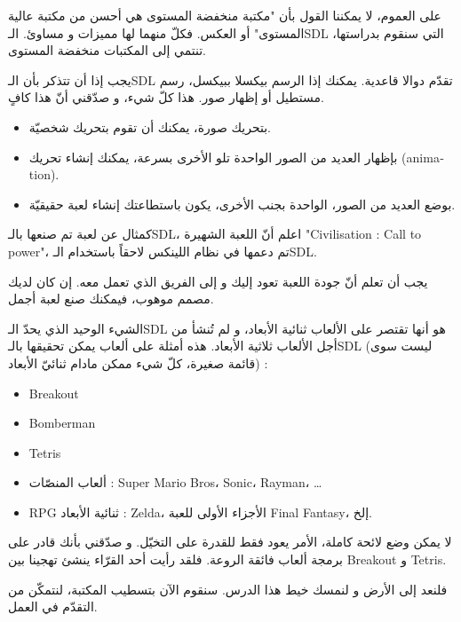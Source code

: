 على العموم، لا يمكننا القول بأن "مكتبة منخفضة المستوى هي أحسن من مكتبة عالية المستوى" أو العكس. فكلّ منهما لها مميزات و مساوئ. الـ\textenglish{SDL}
التي سنقوم بدراستها، تنتمي إلى المكتبات منخفضة المستوى.

يجب إذا أن تتذكر بأن الـ\textenglish{SDL}
تقدّم دوالا قاعدية. يمكنك إذا الرسم بيكسلا ببيكسل، رسم مستطيل أو إظهار صور. هذا كلّ شيء، و صدّقني أنّ هذا كافٍ.

\begin{itemize}
	\item بتحريك صورة، يمكنك أن تقوم بتحريك شخصيّة.
	\item بإظهار العديد من الصور الواحدة تلو الأخرى بسرعة، يمكنك إنشاء تحريك
	(\textenglish{animation}).
	\item بوضع العديد من الصور، الواحدة بجنب الأخرى، يكون باستطاعتك إنشاء لعبة حقيقيّة.
\end{itemize}

كمثال عن لعبة تم صنعها بالـ\textenglish{SDL}،
اعلم أنّ اللعبة الشهيرة
"\textenglish{Civilisation : Call to power}"،
تم دعمها في نظام اللينكس لاحقاً باستخدام الـ\textenglish{SDL}.


يجب أن تعلم أنّ جودة اللعبة تعود إليك و إلى الفريق الذي تعمل معه. إن كان لديك مصمم موهوب، فيمكنك صنع لعبة أجمل.

الشيء الوحيد الذي يحدّ الـ\textenglish{SDL}
هو أنها تقتصر على الألعاب ثنائية الأبعاد، و لم تُنشأ من أجل الألعاب ثلاثية الأبعاد. هذه أمثلة على ألعاب يمكن تحقيقها بالـ\textenglish{SDL}
(ليست سوى قائمة صغيرة، كلّ شيء ممكن مادام ثنائيّ الأبعاد) :

\begin{itemize}
	\item \textenglish{Breakout}
	\item \textenglish{Bomberman}
	\item \textenglish{Tetris}
	\item ألعاب المنصّات :
	\textenglish{Super Mario Bros}، \textenglish{Sonic}، \textenglish{Rayman}، \dots
	\item \textenglish{RPG} ثنائية الأبعاد :
	\textenglish{Zelda}،
	الأجزاء الأولى للعبة
	\textenglish{Final Fantasy}،
	إلخ.
\end{itemize}
لا يمكن وضع لائحة كاملة، الأمر يعود فقط للقدرة على التخيّل. و صدّقني بأنك قادر على برمجة ألعاب فائقة الروعة. فلقد رأيت أحد القرّاء ينشئ تهجينا بين
\textenglish{Breakout}
و
\textenglish{Tetris}.

فلنعد إلى الأرض و لنمسك خيط هذا الدرس. سنقوم الآن بتسطيب المكتبة، لنتمكّن من التقدّم في العمل.

